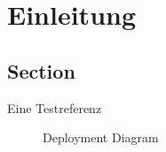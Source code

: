 \chapter{Einleitung}
\label{chapter:introduction}

\section{Section}
Eine Testreferenz ~\cite{latex}

\begin{figure}
    \centering
    
    \caption{Deployment Diagram}
    \label{fig:flux_data_flow}
\end{figure}